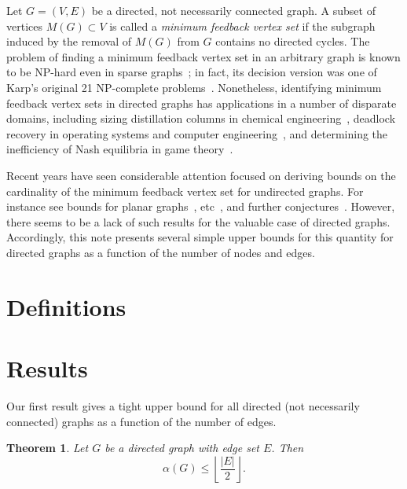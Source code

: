 \documentclass[journal,12pt,onecolumn]{IEEETran}  %
\newtheorem{theorem}{Theorem}[section]
\begin{document}

%
\IEEEpeerreviewmaketitle




Let $G=(V,E)$ be a directed, not necessarily connected graph.
A subset of vertices $M(G)\subset V$ is called a \emph{minimum feedback vertex set} if the subgraph induced by the removal of $M(G)$ from $G$ contains no directed cycles.
The problem of finding a minimum feedback vertex set in an arbitrary graph is known to be NP-hard even in sparse graphs~\cite{nphard}; in fact, its decision version was one of Karp's original 21 NP-complete problems~\cite{Karp1972}.
Nonetheless, identifying minimum feedback vertex sets in directed graphs has applications in a number of disparate domains, including sizing distillation columns in chemical engineering~\cite{chemE}, deadlock recovery in operating systems and computer engineering~\cite{OS,cmpe}, and determining the inefficiency of Nash equilibria in game theory~\cite{Brown2019c}.


Recent years have seen considerable attention focused on deriving bounds on the cardinality of the minimum feedback vertex set for undirected graphs. For instance see bounds for planar graphs~\cite{planar}, etc~\cite{other}, and further conjectures~\cite{conj}.
However, there seems to be a lack of such results for the valuable case of directed graphs.
Accordingly, this note presents several simple upper bounds for this quantity for directed graphs as a function of the number of nodes and edges.

\section{Definitions}

\section{Results}
Our first result gives a tight upper bound for all directed (not necessarily connected) graphs as a function of the number of edges.
\begin{theorem}\label{thm:main}
Let $G$ be a directed graph with edge set $E$.
Then
\begin{equation}\label{eq:main}
\alpha(G) \leq \left\lfloor\frac{|E|}{2}\right\rfloor.
\end{equation}
\end{theorem}
\end{document}
